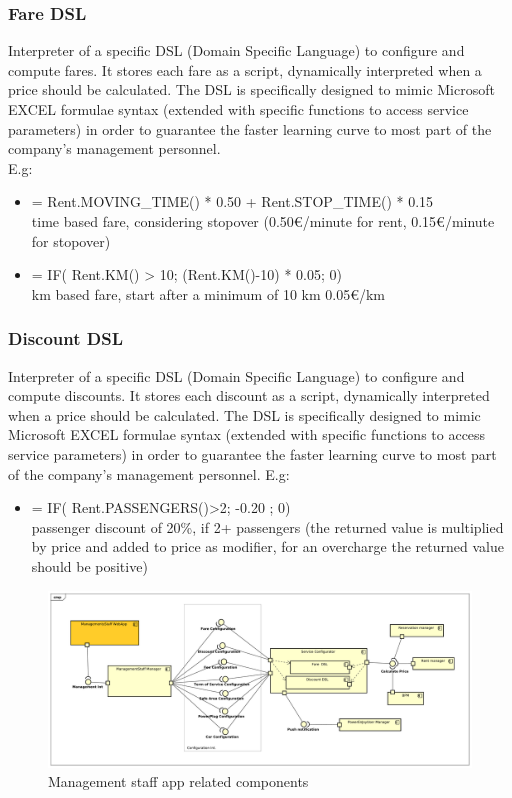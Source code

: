 \documentclass[english]{article}
\begin{document}
		\subsubsection{Fare DSL}
		Interpreter of a specific DSL (Domain Specific Language) to configure and compute fares. It stores each fare as a script,  dynamically interpreted when a price should be calculated. The DSL is specifically designed to mimic Microsoft EXCEL formulae syntax (extended with specific functions to access service parameters) in order to guarantee the faster learning curve to most part of the company's management personnel.\\
		E.g: 
		\begin{itemize}
			\item { = Rent.MOVING\_TIME() * 0.50 + Rent.STOP\_TIME() * 0.15     \\time based fare, considering stopover (0.50\euro/minute for rent, 0.15\euro/minute for stopover)}
			\item { = IF( Rent.KM() > 10; (Rent.KM()-10) * 0.05; 0) 			      \\ km based fare, start after a minimum of 10 km 0.05\euro/km}
		\end{itemize}
		\subsubsection{Discount DSL}
		Interpreter of a specific DSL (Domain Specific Language) to configure and compute discounts. It stores each discount as a script,  dynamically interpreted when a price should be calculated. The DSL is specifically designed to mimic Microsoft EXCEL formulae syntax (extended with specific functions to access service parameters) in order to guarantee the faster learning curve to most part of the company's management personnel.
		E.g: 
		\begin{itemize}
			\item { = IF( Rent.PASSENGERS()>2; -0.20 ; 0)     \\passenger discount of 20\%, if 2+ passengers (the returned value is multiplied by price and added to price as modifier, for an overcharge the returned value should be positive) }
		\end{itemize}
	\begin{figure}[H]
		\centering
		\includegraphics[scale=0.26]{./ComponentDiagrams/ManagementStaff.pdf}%
		\caption{Management staff app related components}
	\end{figure}
	
\end{document}
